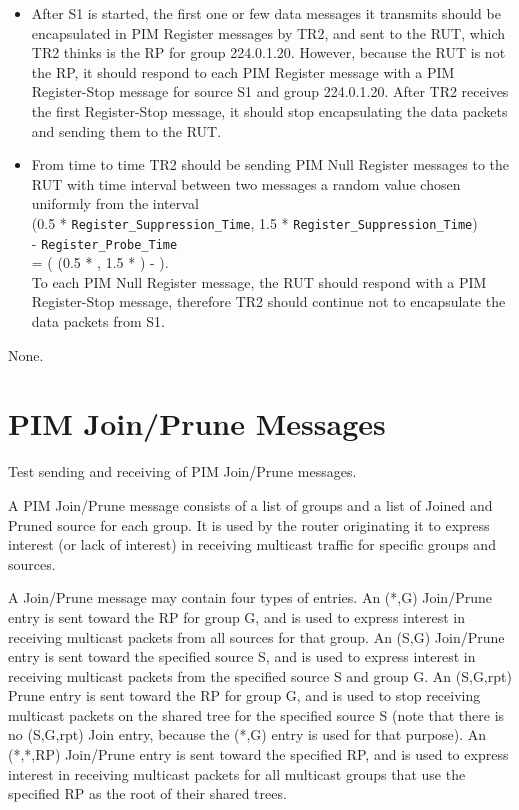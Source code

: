 \documentclass[11pt]{report}
\begin{document}
\begin{itemize}

  \item After S1 is started, the first one or few data messages it transmits
  should be encapsulated in PIM Register messages by TR2, and sent to the RUT,
  which TR2 thinks is the RP for group 224.0.1.20.
  However, because the RUT is not the RP, it should respond to each PIM
  Register message with a PIM Register-Stop message for source S1 and group
  224.0.1.20. After TR2 receives the first Register-Stop message, it should
  stop encapsulating the data packets and sending them to the RUT.

  \item From time to time TR2 should be sending PIM Null Register
  messages to the RUT with time interval between two messages a random
  value chosen uniformly from the interval \\
  (0.5 * \verb=Register_Suppression_Time=,
  1.5 * \verb=Register_Suppression_Time=) \\
  - \verb=Register_Probe_Time= \\
  = ( (0.5 * {\PimsmRegisterSuppressionTime}, 1.5 *
  {\PimsmRegisterSuppressionTime}) - {\PimsmRegisterProbeTime} ). \\
  To each PIM Null Register message, the RUT should respond with a
  PIM Register-Stop message, therefore TR2 should continue not to
  encapsulate the data packets from S1.

\end{itemize}

None.


\chapter{PIM Join/Prune Messages}

Test sending and receiving of PIM Join/Prune messages.

A PIM Join/Prune message consists of a list of groups and a list of
Joined and Pruned source for each group. It is used by the router
originating it to express interest (or lack of interest) in receiving
multicast traffic for specific groups and sources.

A Join/Prune message may contain four types of entries. An (*,G)
Join/Prune entry is sent toward the RP for group G, and is used to
express interest in receiving multicast packets from all sources for
that group. An (S,G) Join/Prune entry is sent toward the specified
source S, and is used to express interest in receiving multicast packets
from the specified source S and group G. An (S,G,rpt) Prune entry is
sent toward the RP for group G, and is used to stop receiving multicast
packets on the shared tree for the specified source S (note that there
is no (S,G,rpt) Join entry, because the (*,G) entry is used for that
purpose). An (*,*,RP) Join/Prune entry is sent toward the specified RP,
and is used to express interest in receiving multicast packets for all
multicast groups that use the specified RP as the root of their shared
trees.
\end{document}
